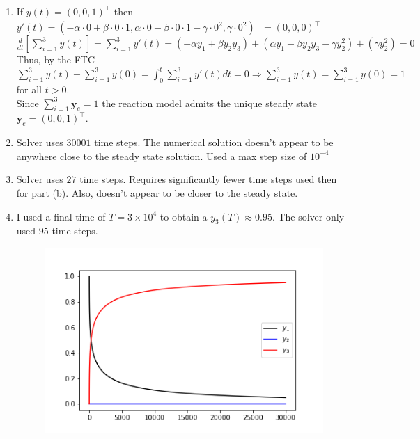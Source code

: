 \documentclass[10pt]{article}
\begin{document}
\begin{enumerate}[label=(\alph*)]
    \item If $y(t)={(0,0,1)}^\top$ then\\
    $y'(t)={(-\alpha\cdot 0+\beta \cdot 0\cdot 1,\alpha\cdot 0-\beta \cdot 0\cdot 1-\gamma\cdot 0^2,\gamma\cdot 0^2)}^\top ={(0,0,0)}^\top$\\
    $\displaystyle\frac{d}{dt}[\sum_{i=1}^{3}y(t)]=\sum_{i=1}^{3}y'(t)=(-\alpha y_1+\beta y_2y_3)+(\alpha y_1-\beta y_2y_3-\gamma y_2^2)+(\gamma y_2^2)=0$\\
    Thus, by the FTC $\displaystyle \sum_{i=1}^{3}y(t)-\sum_{i=1}^{3}y(0)=\int_{0}^{t}\sum_{i=1}^{3}y'(t)dt=0\Rightarrow \sum_{i=1}^{3}y(t)=\sum_{i=1}^{3}y(0)=1$ for all $t>0$.\\
    Since $\displaystyle \sum_{i=1}^{3}\mathbf{y}_e=1$ the reaction model admits the unique steady state $\mathbf{y}_e={(0,0,1)}^\top$.\\
    \item Solver uses $30001$ time steps. The numerical solution doesn't appear to be anywhere close to the steady state solution. Used a max step size of $10^{-4}$
    \item Solver uses $27$ time steps. Requires significantly fewer time steps used then for part (b). Also, doesn't appear to be closer to the steady state.
    \pagebreak
    \item I used a final time of $T=3\times 10^4$ to obtain a $y_3(T)\approx 0.95$. The solver only used $95$ time steps. 
    \begin{figure}[H]
        \includegraphics[scale=0.5]{stiff_solver_chemical_reaction_rate.png}
    \end{figure}
\end{enumerate}

\end{document}
